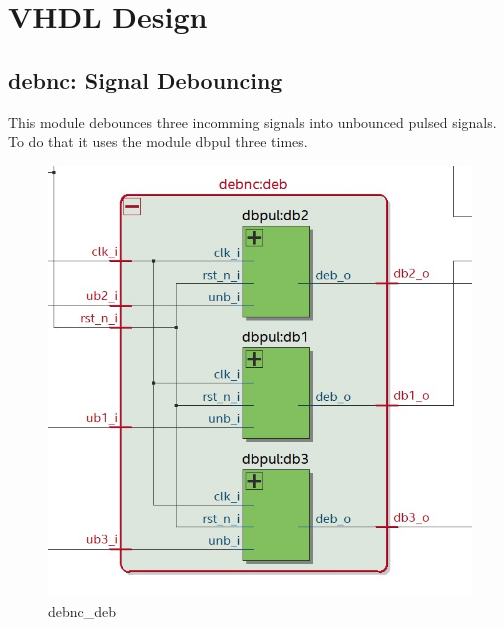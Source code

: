 \documentclass[12pt,a4 paper] {report}
\begin{document}
\newpage

\chapter{VHDL Design}
\section{debnc: Signal Debouncing}
This module debounces three incomming signals into unbounced pulsed signals. To do that it uses the module dbpul 
three times.
\begin{figure}[h]
	\centering	
	\includegraphics[scale=0.3]{../png/debnc_deb.png}
	\caption{debnc\_deb}
\end{figure}
\end{document}
